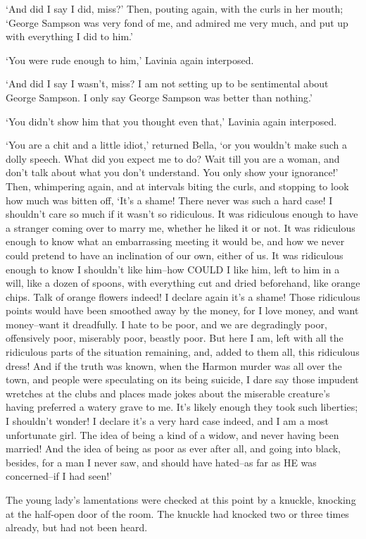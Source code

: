 ‘And did I say I did, miss?’ Then, pouting again, with the curls in her
mouth; ‘George Sampson was very fond of me, and admired me very much,
and put up with everything I did to him.’

‘You were rude enough to him,’ Lavinia again interposed.

‘And did I say I wasn’t, miss? I am not setting up to be sentimental
about George Sampson. I only say George Sampson was better than
nothing.’

‘You didn’t show him that you thought even that,’ Lavinia again
interposed.

‘You are a chit and a little idiot,’ returned Bella, ‘or you wouldn’t
make such a dolly speech. What did you expect me to do? Wait till you
are a woman, and don’t talk about what you don’t understand. You only
show your ignorance!’ Then, whimpering again, and at intervals biting
the curls, and stopping to look how much was bitten off, ‘It’s a shame!
There never was such a hard case! I shouldn’t care so much if it wasn’t
so ridiculous. It was ridiculous enough to have a stranger coming over
to marry me, whether he liked it or not. It was ridiculous enough to
know what an embarrassing meeting it would be, and how we never
could pretend to have an inclination of our own, either of us. It was
ridiculous enough to know I shouldn’t like him--how COULD I like him,
left to him in a will, like a dozen of spoons, with everything cut and
dried beforehand, like orange chips. Talk of orange flowers indeed!
I declare again it’s a shame! Those ridiculous points would have been
smoothed away by the money, for I love money, and want money--want it
dreadfully. I hate to be poor, and we are degradingly poor, offensively
poor, miserably poor, beastly poor. But here I am, left with all the
ridiculous parts of the situation remaining, and, added to them all,
this ridiculous dress! And if the truth was known, when the Harmon
murder was all over the town, and people were speculating on its being
suicide, I dare say those impudent wretches at the clubs and places made
jokes about the miserable creature’s having preferred a watery grave to
me. It’s likely enough they took such liberties; I shouldn’t wonder! I
declare it’s a very hard case indeed, and I am a most unfortunate girl.
The idea of being a kind of a widow, and never having been married!
And the idea of being as poor as ever after all, and going into black,
besides, for a man I never saw, and should have hated--as far as HE was
concerned--if I had seen!’

The young lady’s lamentations were checked at this point by a knuckle,
knocking at the half-open door of the room. The knuckle had knocked two
or three times already, but had not been heard.

